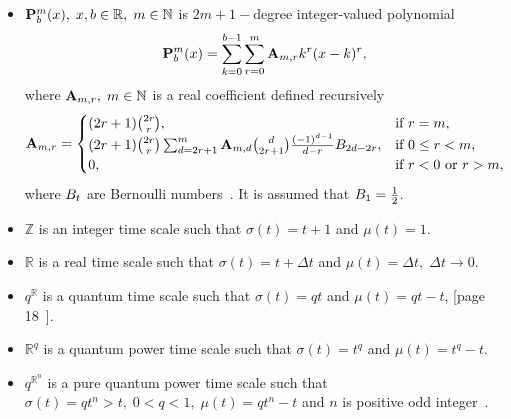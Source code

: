 \begin{itemize}
    \item ${\mathbf{P}}\sp{m} \sb{b}(x), \; x,b\in\mathbb{R}, \; m\in\mathbb{N}$ is $2m+1-$degree integer-valued polynomial~\cite{kolosov2016link}
    \begin{equation}
        {\mathbf{P}}\sp{m} \sb{b}(x) = \sum_{k=0}^{b-1} \sum_{r=0}^{m} {\mathbf{A}} \sb{m,r} k^r(x-k)^r,
        \label{eq:polynomial_p}
    \end{equation}
    where ${\mathbf{A}} \sb{m,r}, \; m\in\mathbb{N}$ is a real coefficient defined recursively
    \[
        {\mathbf{A}} \sb{m,r} =
        \begin{cases}
        (2r+1)
            \binom{2r}{r}, & \text{if } r=m,\\
            (2r+1) \binom{2r}{r} \sum_{d=2r+1}^{m} {\mathbf{A}} \sb{m,d} \binom{d}{2r+1} \frac{(-1)^{d-1}}{d-r}
            {B}\sb{2d-2r}, & \text{if } 0 \leq r<m,\\
            0, & \text{if } r<0 \text{ or } r>m,
        \end{cases}
    \]
    where ${B}\sb{t}$ are Bernoulli numbers~\cite{WeissteinBernoulli}.
    It is assumed that ${B}\sb{1}=\frac{1}{2}$.

    \item $\mathbb{Z}$ is an integer time scale such that $\sigma(t) = t+1$ and $\mu(t) = 1$.

    \item $\mathbb{R}$ is a real time scale such that $\sigma(t) = t+\Delta t$ and $\mu(t) = \Delta t, \; \Delta t \to 0$.

    \item $q^\mathbb{R}$ is a quantum time scale such that $\sigma(t) = qt$ and $\mu(t) = qt - t$,
    [page 18~\cite{Bohner2001DynamicEO}].

    \item $\mathbb{R}^q$ is a quantum power time scale such that $\sigma(t) = t^q$ and $\mu(t) = t^q - t$.

    \item $q^{\mathbb{R}^n}$ is a pure quantum power time scale
    such that $\sigma(t) = qt^n > t, \; 0<q<1, \; \mu(t) = qt^n - t$ and $n$ is positive
    odd integer~\cite{aldwoah2011power}.
\end{itemize}